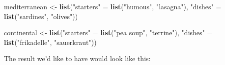 \documentclass[]{gitbook}
\newenvironment{Shaded}{\begin{snugshade}}{\end{snugshade}}
\newcommand{\DecValTok}[1]{\textcolor[rgb]{0.00,0.00,0.81}{#1}}
\newcommand{\KeywordTok}[1]{\textcolor[rgb]{0.13,0.29,0.53}{\textbf{#1}}}
\newcommand{\NormalTok}[1]{#1}
\newcommand{\OperatorTok}[1]{\textcolor[rgb]{0.81,0.36,0.00}{\textbf{#1}}}
\newcommand{\StringTok}[1]{\textcolor[rgb]{0.31,0.60,0.02}{#1}}
\theoremstyle{definition}
\theoremstyle{definition}
\theoremstyle{definition}
\theoremstyle{remark}
\begin{document}
\begin{Shaded}
\begin{Highlighting}[]
\NormalTok{mediterranean <-}\StringTok{ }\KeywordTok{list}\NormalTok{(}\StringTok{"starters"}\NormalTok{ =}\StringTok{ }\KeywordTok{list}\NormalTok{(}\StringTok{"humous"}\NormalTok{, }\StringTok{"lasagna"}\NormalTok{), }\StringTok{"dishes"}\NormalTok{ =}\StringTok{ }\KeywordTok{list}\NormalTok{(}\StringTok{"sardines"}\NormalTok{, }\StringTok{"olives"}\NormalTok{))}

\NormalTok{continental <-}\StringTok{ }\KeywordTok{list}\NormalTok{(}\StringTok{"starters"}\NormalTok{ =}\StringTok{ }\KeywordTok{list}\NormalTok{(}\StringTok{"pea soup"}\NormalTok{, }\StringTok{"terrine"}\NormalTok{), }\StringTok{"dishes"}\NormalTok{ =}\StringTok{ }\KeywordTok{list}\NormalTok{(}\StringTok{"frikadelle"}\NormalTok{, }\StringTok{"sauerkraut"}\NormalTok{))}
\end{Highlighting}
\end{Shaded}

The result we'd like to have would look like this:

\begin{Shaded}
\end{Shaded}
\end{document}

